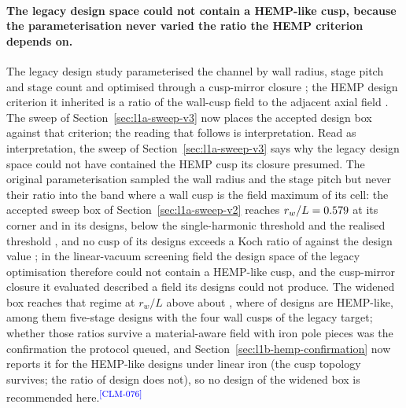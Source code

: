 \documentclass[11pt]{article}
\newcommand{\EvidenceClaim}[2]{#2\textsuperscript{\textcolor{blue}{[#1]}}}
\begin{document}
\paragraph{The legacy design space could not contain a HEMP-like cusp, because
the parameterisation never varied the ratio the HEMP criterion depends on.}
The legacy design study parameterised the channel by wall radius, stage pitch and
stage count and optimised through a cusp-mirror closure \cite{Muffatti2017}; the
HEMP design criterion it inherited is a ratio of the wall-cusp field to the
adjacent axial field \cite{Koch2007}. The sweep of Section~\ref{sec:l1a-sweep-v3}
now places the accepted design box against that criterion; the reading that
follows is interpretation.
\EvidenceClaim{CLM-076}{Read as interpretation, the sweep of
Section~\ref{sec:l1a-sweep-v3} says why the legacy design space could not have
contained the HEMP cusp its closure presumed. The original parameterisation
sampled the wall radius and the stage pitch but never their ratio into the band
where a wall cusp is the field maximum of its cell: the accepted sweep box of
Section~\ref{sec:l1a-sweep-v2} reaches $r_w/L = 0.579$ at its corner
and \SwtRegionRwOverLMax{} in its designs, below the single-harmonic threshold
\SwtRwOverLStarThree{} and the realised threshold \SwtRwOverLStarFromSlope, and no
cusp of its \SwtRegionDesigns{} designs exceeds a Koch ratio of \SwtRegionMaxRho{}
against the design value \SwtRhoThreshold; in the linear-vacuum screening field the
design space of the legacy optimisation therefore could not contain a HEMP-like
cusp, and the cusp-mirror closure it evaluated described a field its designs could
not produce. The widened box reaches that regime at $r_w/L$ above about
\SwtRwOverLStarFromSlope, where \SwtHempLikeCount{} of \SwtSobolDesigns{} designs are
HEMP-like, among them \SwtFiveStageFourCuspHempLike{} five-stage designs with the
four wall cusps of the legacy target; whether those ratios survive a material-aware
field with iron pole pieces was the confirmation the protocol queued, and
Section~\ref{sec:l1b-hemp-confirmation} now reports it for the \HmcDesignCount{}
HEMP-like designs under linear iron (the cusp topology survives; the ratio of
\HmcLostDesigns{} design does not), so no design of the widened box is recommended
here.}
\end{document}
